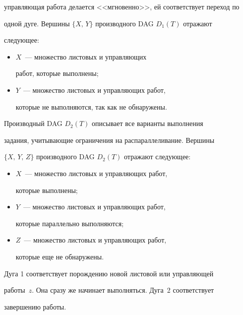 управляющая работа делается <<мгновенно>>, ей соответствует переход по 


одной дуге.  Вершины $\{X,\,Y\}$ производного DAG $D_1(T)$ отражают 


следующее:


      \begin{itemize}


        \item  $X$~--- множество листовых и управляющих 


работ, которые выполнены;\\[-15pt]


\item  $Y$~--- множество листовых и управляющих работ, 


которые не выполняются, так как не обнаружены. 


\end{itemize}





      Производный DAG $D_2(T)$ описывает все варианты выполнения 


задания, учитывающие ограничения на распараллеливание. Вершины 


$\{X,\,Y,\,Z\}$ производного DAG $D_2(T)$ отражают следующее: 


      \begin{itemize}


\item  $X$~--- множество листовых и управляющих работ, 


которые выполнены; \\[-15pt]


\item   $Y$~--- множество листовых и управляющих работ, 


которые параллельно выполняются;\\[-15pt]


\item   $Z$~--- множество листовых и управляющих работ, 


которые еще не обнару\-жены. 


\end{itemize}


      


      Дуга 1 соответствует порождению новой листовой или управляющей 


работы~$z$. Она сразу же начинает выполняться. Дуга~2 соответствует 


завершению работы.


